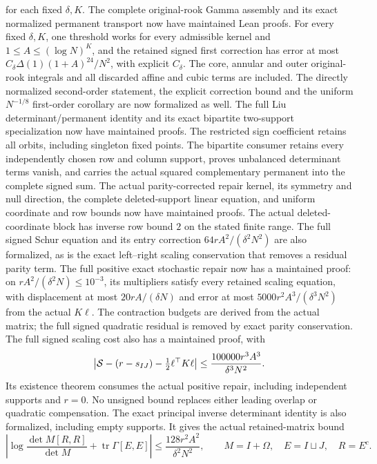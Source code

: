 \documentclass[11pt]{article}
\theoremstyle{remark}
\begin{document}
for each fixed \(\delta,K\).
The complete original-rook Gamma assembly and its exact normalized
permanent transport now have maintained Lean proofs. For every fixed
\(\delta,K\), one threshold works for every admissible kernel and
\(1\le A\le(\log N)^K\), and the retained signed first correction has
error at most \(C_\delta\Delta(1)(1+A)^{24}/N^2\), with explicit
\(C_\delta\). The core, annular and outer original-rook integrals and
all discarded affine and cubic terms are included. The directly normalized
second-order statement, the explicit correction bound and the uniform
\(N^{-1/8}\) first-order corollary are now formalized as well.
The full Liu determinant/permanent identity and its exact bipartite
two-support specialization now have maintained proofs. The restricted
sign coefficient retains all orbits, including singleton fixed points.
The bipartite consumer retains every independently chosen row and column
support, proves unbalanced determinant terms vanish, and carries the
actual squared complementary permanent into the complete signed sum.
The actual parity-corrected repair kernel, its symmetry and null direction,
the complete deleted-support linear equation, and uniform coordinate and
row bounds now have maintained proofs. The actual deleted-coordinate
block has inverse row bound \(2\) on the stated finite range.
The full signed Schur equation and its entry correction
\(64rA^2/(\delta^2N^2)\) are also formalized, as is the exact
left--right scaling conservation that removes a residual parity term.
The full positive exact stochastic repair now has a maintained proof:
on \(rA^2/(\delta^2N)\leq10^{-3}\), its multipliers satisfy every
retained scaling equation, with displacement at most \(20rA/(\delta N)\)
and error at most \(5000r^2A^3/(\delta^3N^2)\) from the actual \(K\ell\).
The contraction budgets are derived from the actual matrix; the full
signed quadratic residual is removed by exact parity conservation.
The full signed scaling cost also has a maintained proof, with
\[
 \left|{\cal S}-(r-s_{IJ})-\tfrac12\ell^\top K\ell\right|
 \leq\frac{100000r^3A^3}{\delta^3N^2}.
\]
Its existence theorem consumes the actual positive repair, including
independent supports and \(r=0\). No unsigned bound replaces either
leading overlap or quadratic compensation.
The exact principal inverse determinant identity is also formalized,
including empty supports. It gives the actual retained-matrix bound
\[
 \left|\log\frac{\det M[R,R]}{\det M}
                 +\operatorname{tr}\Gamma[E,E]\right|
 \leq\frac{128r^2A^2}{\delta^2N^2},
 \qquad M=I+\Omega,\quad E=I\sqcup J,\quad R=E^c.
\]
\end{document}

